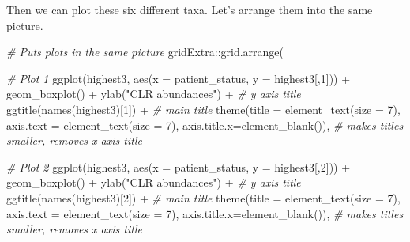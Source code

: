 \documentclass[
]{book}
\newenvironment{Shaded}{\begin{snugshade}}{\end{snugshade}}
\newcommand{\AttributeTok}[1]{\textcolor[rgb]{0.77,0.63,0.00}{#1}}
\newcommand{\CommentTok}[1]{\textcolor[rgb]{0.56,0.35,0.01}{\textit{#1}}}
\newcommand{\DecValTok}[1]{\textcolor[rgb]{0.00,0.00,0.81}{#1}}
\newcommand{\FunctionTok}[1]{\textcolor[rgb]{0.00,0.00,0.00}{#1}}
\newcommand{\NormalTok}[1]{#1}
\newcommand{\SpecialCharTok}[1]{\textcolor[rgb]{0.00,0.00,0.00}{#1}}
\newcommand{\StringTok}[1]{\textcolor[rgb]{0.31,0.60,0.02}{#1}}
\begin{document}
Then we can plot these six different taxa. Let's arrange them into the same picture.

\begin{Shaded}
\begin{Highlighting}[]
\CommentTok{\# Puts plots in the same picture}
\NormalTok{gridExtra}\SpecialCharTok{::}\FunctionTok{grid.arrange}\NormalTok{(}
  
  \CommentTok{\# Plot 1}
  \FunctionTok{ggplot}\NormalTok{(highest3, }\FunctionTok{aes}\NormalTok{(}\AttributeTok{x =}\NormalTok{ patient\_status, }\AttributeTok{y =}\NormalTok{ highest3[,}\DecValTok{1}\NormalTok{])) }\SpecialCharTok{+} 
    \FunctionTok{geom\_boxplot}\NormalTok{() }\SpecialCharTok{+} 
    \FunctionTok{ylab}\NormalTok{(}\StringTok{"CLR abundances"}\NormalTok{) }\SpecialCharTok{+} \CommentTok{\# y axis title}
    \FunctionTok{ggtitle}\NormalTok{(}\FunctionTok{names}\NormalTok{(highest3)[}\DecValTok{1}\NormalTok{]) }\SpecialCharTok{+} \CommentTok{\# main title}
    \FunctionTok{theme}\NormalTok{(}\AttributeTok{title =} \FunctionTok{element\_text}\NormalTok{(}\AttributeTok{size =} \DecValTok{7}\NormalTok{),}
          \AttributeTok{axis.text =} \FunctionTok{element\_text}\NormalTok{(}\AttributeTok{size =} \DecValTok{7}\NormalTok{),}
          \AttributeTok{axis.title.x=}\FunctionTok{element\_blank}\NormalTok{()), }\CommentTok{\# makes titles smaller, removes x axis title}
  
  \CommentTok{\# Plot 2}
  \FunctionTok{ggplot}\NormalTok{(highest3, }\FunctionTok{aes}\NormalTok{(}\AttributeTok{x =}\NormalTok{ patient\_status, }\AttributeTok{y =}\NormalTok{ highest3[,}\DecValTok{2}\NormalTok{])) }\SpecialCharTok{+} 
    \FunctionTok{geom\_boxplot}\NormalTok{() }\SpecialCharTok{+} 
    \FunctionTok{ylab}\NormalTok{(}\StringTok{"CLR abundances"}\NormalTok{) }\SpecialCharTok{+} \CommentTok{\# y axis title}
    \FunctionTok{ggtitle}\NormalTok{(}\FunctionTok{names}\NormalTok{(highest3)[}\DecValTok{2}\NormalTok{]) }\SpecialCharTok{+} \CommentTok{\# main title}
    \FunctionTok{theme}\NormalTok{(}\AttributeTok{title =} \FunctionTok{element\_text}\NormalTok{(}\AttributeTok{size =} \DecValTok{7}\NormalTok{),}
          \AttributeTok{axis.text =} \FunctionTok{element\_text}\NormalTok{(}\AttributeTok{size =} \DecValTok{7}\NormalTok{),}
          \AttributeTok{axis.title.x=}\FunctionTok{element\_blank}\NormalTok{()), }\CommentTok{\# makes titles smaller, removes x axis title}
  

\end{Highlighting}
\end{Shaded}
\end{document}
